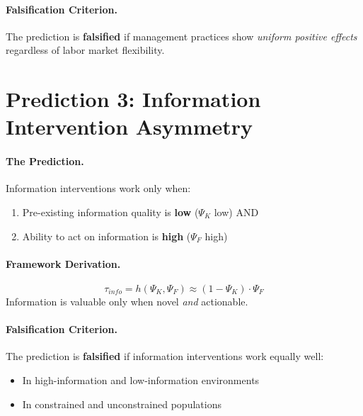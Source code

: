 \paragraph{Falsification Criterion.}
The prediction is \textbf{falsified} if management practices show \textit{uniform positive effects} regardless of labor market flexibility.


\section{Prediction 3: Information Intervention Asymmetry}
\label{sec:S-prediction3}

\paragraph{The Prediction.}
Information interventions work only when:
\begin{enumerate}
    \item Pre-existing information quality is \textbf{low} ($\Psi_K$ low) AND
    \item Ability to act on information is \textbf{high} ($\Psi_F$ high)
\end{enumerate}

\paragraph{Framework Derivation.}
\begin{equation}
    \tau_{info} = h(\Psi_K, \Psi_F) \approx (1 - \Psi_K) \cdot \Psi_F
\end{equation}
Information is valuable only when novel \textit{and} actionable.

\paragraph{Falsification Criterion.}
The prediction is \textbf{falsified} if information interventions work equally well:
\begin{itemize}
    \item In high-information and low-information environments
    \item In constrained and unconstrained populations
\end{itemize}


